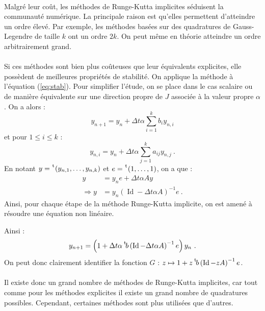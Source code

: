     \paragraph{}
    Malgré leur coût, les méthodes de Runge-Kutta implicites séduisent la communauté numérique.
    La principale raison est qu'elles permettent d'atteindre un ordre élevé.
    Par exemple, les méthodes basées sur des quadratures de Gauss-Legendre de taille $k$ ont un ordre $2k$.
    On peut même en théorie atteindre un ordre arbitrairement grand.

    \paragraph{}
    Si ces méthodes sont bien plus coûteuses que leur équivalents explicites, elle possèdent de meilleures propriétés de stabilité.
    On applique la méthode à l'équation (\ref{eq:stab}).
    Pour simplifier l'étude, on se place dans le cas scalaire ou de manière équivalente sur une direction propre de $J$ associée à la valeur propre $\alpha$.
    On a alors :
    \[y_{n+1} = y_n + \Delta t\alpha \sum_{i = 1}^k b_iy_{n,i}\]
    et pour $1\leq i\leq k$ :
    \[y_{n,i} = y_n + \Delta t\alpha \sum_{j = 1}^k a_{ij}y_{n,j}\ .\]
    En notant $y = \mskip1mu\prescript{\smash{\mathrm t\mkern-3mu}}{}{\mathstrut\left(y_{n,1}, \dots, y_{n,k}\right)}$ et $e = \mskip1mu\prescript{\smash{\mathrm t\mkern-3mu}}{}{\mathstrut\left(1, \dots, 1\right)}$, on a que :
    \begin{align*}
      y &= y_ne + \Delta t\alpha Ay \\
      \Rightarrow y &= y_n\left(\operatorname{Id} - \Delta t\alpha A\right)^{-1}e\ .
    \end{align*}    Ainsi, pour chaque étape de la méthode Runge-Kutta implicite, on est amené à résoudre une équation non linéaire.

    Ainsi :
    \[y_{n+1} = \left(1 + \Delta t\alpha\mskip1mu\prescript{\smash{\mathrm t\mkern-3mu}}{}{\mathstrut b}\left(\operatorname{Id} - \Delta t\alpha A\right)^{-1}e\right)y_n\ .\]
    On peut donc clairement identifier la fonction $G$ : $z \mapsto 1 + z\mskip1mu\prescript{\smash{\mathrm t\mkern-3mu}}{}{\mathstrut b}\left(\operatorname{Id} - zA\right)^{-1}e$.

    \paragraph{}
    Il existe donc un grand nombre de méthodes de Runge-Kutta implicites, car tout comme pour les méthodes explicites il existe un grand nombre de quadratures possibles.
    Cependant, certaines méthodes sont plus utilisées que d'autres.

